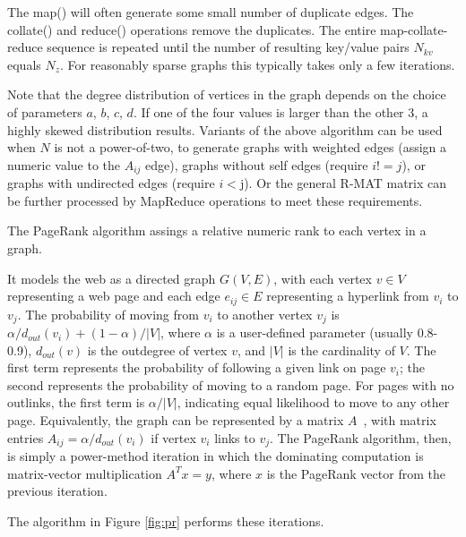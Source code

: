 The map() will often generate some small number of duplicate edges.
The collate() and reduce() operations remove the duplicates.  The
entire map-collate-reduce sequence is repeated until the number of
resulting key/value pairs $N_{kv}$ equals $N_z$.  For reasonably
sparse graphs this typically takes only a few iterations.

Note that the degree distribution of vertices in the graph depends on
the choice of parameters $a$, $b$, $c$, $d$.  If one of the four
values is larger than the other 3, a highly skewed distribution
results.  Variants of the above algorithm can be used when $N$ is not
a power-of-two, to generate graphs with weighted edges (assign a
numeric value to the $A_{ij}$ edge), graphs without self edges
(require $i != j$), or graphs with undirected edges (require $i < $j).
Or the general R-MAT matrix can be further processed by MapReduce
operations to meet these requirements.

The PageRank algorithm assings a relative numeric rank to each
vertex in a graph.

It models the web as a directed graph $G(V,E)$, with each vertex $v
\in V$ representing a web page and each edge $e_{ij} \in E$
representing a hyperlink from $v_i$ to $v_j$.  The probability of
moving from $v_i$ to another vertex $v_j$ is $\alpha/d_{out}(v_i) +
(1-\alpha)/|V|$, where $\alpha$ is a user-defined parameter (usually
0.8-0.9), $d_{out}(v)$ is the outdegree of vertex $v$, and $|V|$ is
the cardinality of $V$.  The first term represents the probability of
following a given link on page $v_i$; the second represents the
probability of moving to a random page.  For pages with no outlinks,
the first term is $\alpha/|V|$, indicating equal likelihood to move to
any other page.  Equivalently, the graph can be represented by a
matrix $A$~\cite{LangvilleMeyer05a}, with matrix entries $A_{ij} =
\alpha/d_{out}(v_i)$ if vertex $v_i$ links to $v_j$.  The PageRank
algorithm, then, is simply a power-method iteration in which the
dominating computation is matrix-vector multiplication $A^T x=y$,
where $x$ is the PageRank vector from the previous iteration.

The algorithm in Figure \ref{fig:pr} performs these
iterations.

